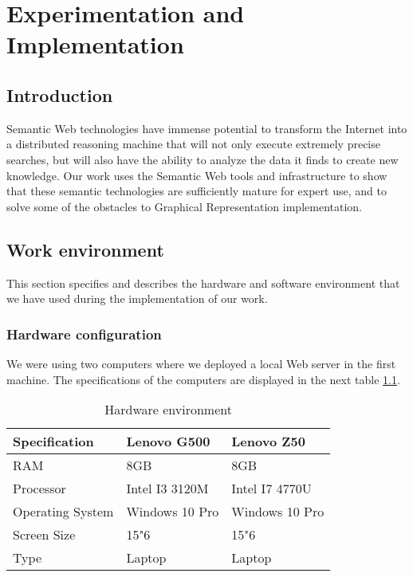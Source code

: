 \chapter{Experimentation and Implementation}
\label{chap_imp}

\section*{Introduction}

Semantic Web technologies have immense potential to transform the Internet into a distributed reasoning machine that will not only execute extremely precise searches, but will also have the ability to analyze the data it finds to create new knowledge. Our work uses the Semantic Web tools and infrastructure to show that these semantic technologies are sufficiently mature for expert use, and to solve some of the obstacles to Graphical Representation implementation. 

\section{Work environment}
\label{chap_work}

This section specifies and describes the hardware and software environment that we have used during the implementation of our work.  

\subsection{Hardware configuration}

We were using two computers where we deployed a local Web server in the first machine. The specifications of the computers are displayed in the next table \ref{tablehard}.
\begin{table}[H]
\centering
\caption{Hardware environment}
\begin{tabular}{|l|l|l|}
\hline
Specification & Lenovo G500 & Lenovo Z50 \\ 
\hline
RAM & 8GB & 8GB\\ 
\hline
Processor & Intel I3 3120M & Intel I7 4770U \\
\hline
Operating System & Windows 10 Pro & Windows 10 Pro \\ 
\hline
Screen Size & 15"6 & 15"6 \\ 
\hline
Type & Laptop & Laptop \\
\hline
\end{tabular}
\label{tablehard}
\end{table}

